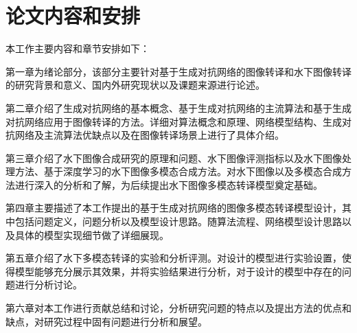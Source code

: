 \section{论文内容和安排}
本工作主要内容和章节安排如下：

第一章为绪论部分，该部分主要针对基于生成对抗网络的图像转译和水下图像转译的研究背景和意义、国内外研究现状以及课题来源进行论述。

第二章介绍了生成对抗网络的基本概念、基于生成对抗网络的主流算法和基于生成对抗网络应用于图像转译的方法。详细对算法概念和原理、网络模型结构、生成对抗网络及主流算法优缺点以及在图像转译场景上进行了具体介绍。

第三章介绍了水下图像合成研究的原理和问题、水下图像评测指标以及水下图像处理方法、基于深度学习的水下图像多模态合成方法。对水下图像以及多模态合成方法进行深入的分析和了解，为后续提出水下图像多模态转译模型奠定基础。

第四章主要描述了本工作提出的基于生成对抗网络的图像多模态转译模型设计，其中包括问题定义，问题分析以及模型设计思路。随算法流程、网络模型设计思路以及具体的模型实现细节做了详细展现。


第五章介绍了水下多模态转译的实验和分析评测。对设计的模型进行实验设置，使得模型能够充分展示其效果，并将实验结果进行分析，对于设计的模型中存在的问题进行分析讨论。

第六章对本工作进行贡献总结和讨论，分析研究问题的特点以及提出方法的优点和缺点，对研究过程中固有问题进行分析和展望。